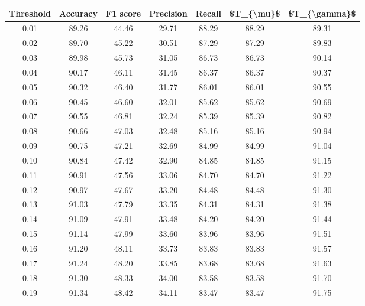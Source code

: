 \begin{tabular}{|c|c|c|c|c|c|c|}
\hline
 Threshold &  Accuracy &  F1 score &  Precision &  Recall &  \$T\_\{\textbackslash mu\}\$ &  \$T\_\{\textbackslash gamma\}\$ \\
\hline
      0.01 &     89.26 &     44.46 &      29.71 &   88.29 &      88.29 &         89.31 \\
      0.02 &     89.70 &     45.22 &      30.51 &   87.29 &      87.29 &         89.83 \\
      0.03 &     89.98 &     45.73 &      31.05 &   86.73 &      86.73 &         90.14 \\
      0.04 &     90.17 &     46.11 &      31.45 &   86.37 &      86.37 &         90.37 \\
      0.05 &     90.32 &     46.40 &      31.77 &   86.01 &      86.01 &         90.55 \\
      0.06 &     90.45 &     46.60 &      32.01 &   85.62 &      85.62 &         90.69 \\
      0.07 &     90.55 &     46.81 &      32.24 &   85.39 &      85.39 &         90.82 \\
      0.08 &     90.66 &     47.03 &      32.48 &   85.16 &      85.16 &         90.94 \\
      0.09 &     90.75 &     47.21 &      32.69 &   84.99 &      84.99 &         91.04 \\
      0.10 &     90.84 &     47.42 &      32.90 &   84.85 &      84.85 &         91.15 \\
      0.11 &     90.91 &     47.56 &      33.06 &   84.70 &      84.70 &         91.22 \\
      0.12 &     90.97 &     47.67 &      33.20 &   84.48 &      84.48 &         91.30 \\
      0.13 &     91.03 &     47.79 &      33.35 &   84.31 &      84.31 &         91.38 \\
      0.14 &     91.09 &     47.91 &      33.48 &   84.20 &      84.20 &         91.44 \\
      0.15 &     91.14 &     47.99 &      33.60 &   83.96 &      83.96 &         91.51 \\
      0.16 &     91.20 &     48.11 &      33.73 &   83.83 &      83.83 &         91.57 \\
      0.17 &     91.24 &     48.20 &      33.85 &   83.68 &      83.68 &         91.63 \\
      0.18 &     91.30 &     48.33 &      34.00 &   83.58 &      83.58 &         91.70 \\
      0.19 &     91.34 &     48.42 &      34.11 &   83.47 &      83.47 &         91.75 \\

\end{tabular}
